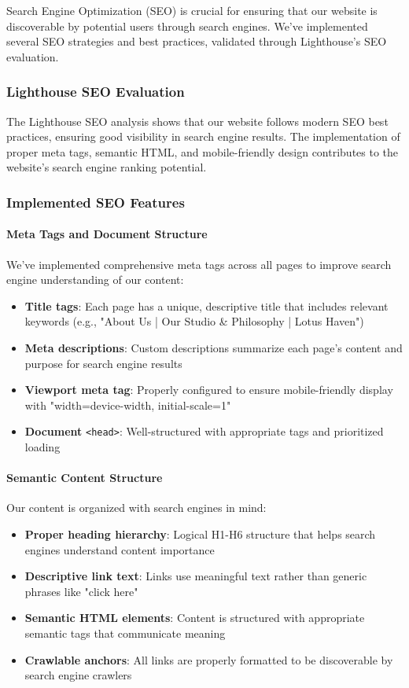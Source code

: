 Search Engine Optimization (SEO) is crucial for ensuring that our website is discoverable by potential users through search engines. We've implemented several SEO strategies and best practices, validated through Lighthouse's SEO evaluation.

\subsubsection{Lighthouse SEO Evaluation}

The Lighthouse SEO analysis shows that our website follows modern SEO best practices, ensuring good visibility in search engine results. The implementation of proper meta tags, semantic HTML, and mobile-friendly design contributes to the website's search engine ranking potential.

\subsubsection{Implemented SEO Features}

\paragraph{Meta Tags and Document Structure}
We've implemented comprehensive meta tags across all pages to improve search engine understanding of our content:

\begin{itemize}
    \item \textbf{Title tags}: Each page has a unique, descriptive title that includes relevant keywords (e.g., "About Us | Our Studio \& Philosophy | Lotus Haven")
    \item \textbf{Meta descriptions}: Custom descriptions summarize each page's content and purpose for search engine results
    \item \textbf{Viewport meta tag}: Properly configured to ensure mobile-friendly display with "width=device-width, initial-scale=1"
    \item \textbf{Document} \texttt{<head>}: Well-structured with appropriate tags and prioritized loading
\end{itemize}

\paragraph{Semantic Content Structure}
Our content is organized with search engines in mind:

\begin{itemize}
    \item \textbf{Proper heading hierarchy}: Logical H1-H6 structure that helps search engines understand content importance
    \item \textbf{Descriptive link text}: Links use meaningful text rather than generic phrases like "click here"
    \item \textbf{Semantic HTML elements}: Content is structured with appropriate semantic tags that communicate meaning
    \item \textbf{Crawlable anchors}: All links are properly formatted to be discoverable by search engine crawlers
\end{itemize}

